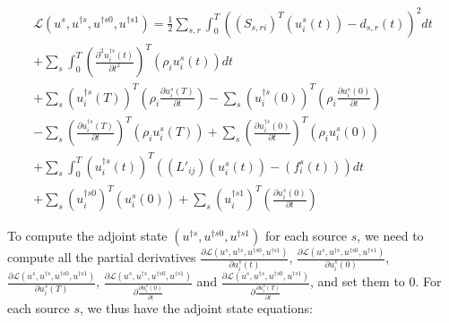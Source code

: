 \documentclass{article}
\begin{document}
\begin{equation}
	\begin{split}
		\mathscr{L} (u^s, u^{\dagger s}, u^{\dagger s 0}, u^{\dagger s 1}) = \frac{1}{2} \sum_{s, r} \int_0^T \left( \left( S_{s, r i} \right) ^{T} \left( u_i^s (t) \right) - d_{s, r} (t) \right) ^2 dt \\
		+ \sum_s \int_0^T \left( \frac{\partial ^2 u_i^{\dagger s} (t)}{\partial t^2} \right) ^{T} \left( \rho_i u_i^s (t) \right) dt \\
		+ \sum_s \left( u_i^{\dagger s} (T) \right) ^{T} \left( \rho_i \frac{\partial u_i^s (T)}{\partial t} \right) - \sum_s \left( u_i^{\dagger s} (0) \right) ^{T} \left( \rho_i \frac{\partial u_i^s (0)}{\partial t} \right) \\
		- \sum_s \left( \frac{\partial u_i^{\dagger s} (T)}{\partial t} \right) ^{T} \left( \rho_i u_i^s (T) \right) + \sum_s \left( \frac{\partial u_i^{\dagger s} (0)}{\partial t} \right) ^{T} \left( \rho_i u_i^s (0) \right) \\
		+ \sum_s \int_0^T \left( u_i^{\dagger s} (t) \right) ^{T} \left( \left( L'_{ij} \right) \left( u_i^s (t) \right) - \left( f_i^s (t) \right) \right) dt \\
		+ \sum_s \left( u_i^{\dagger s 0} \right) ^{T} \left( u_i^s(0) \right) + \sum_s \left( u_i^{\dagger s 1} \right) ^{T} \left( \frac{\partial u_i^s (0)}{\partial t} \right)
	\end{split}
\end{equation}

To compute the adjoint state $(u^{\dagger s}, u^{\dagger s 0}, u^{\dagger s 1})$ for each source $s$, we need to compute all the partial derivatives $\frac{\partial \mathscr{L} (u^s, u^{\dagger s}, u^{\dagger s 0}, u^{\dagger s 1})}{\partial u_i^s (t)}$, $\frac{\partial \mathscr{L} (u^s, u^{\dagger s}, u^{\dagger s 0}, u^{\dagger s 1})}{\partial u_i^s (0)}$, $\frac{\partial \mathscr{L} (u^s, u^{\dagger s}, u^{\dagger s 0}, u^{\dagger s 1})}{\partial u_i^s (T)}$, $\frac{\partial \mathscr{L} (u^s, u^{\dagger s}, u^{\dagger s 0}, u^{\dagger s 1})}{\partial \frac{\partial u_i^s (0)}{\partial t}}$ and $\frac{\partial \mathscr{L} (u^s, u^{\dagger s}, u^{\dagger s 0}, u^{\dagger s 1})}{\partial \frac{\partial u_i^s (T)}{\partial t}}$, and set them to 0. For each source $s$, we thus have the adjoint state equations:
\end{document}
